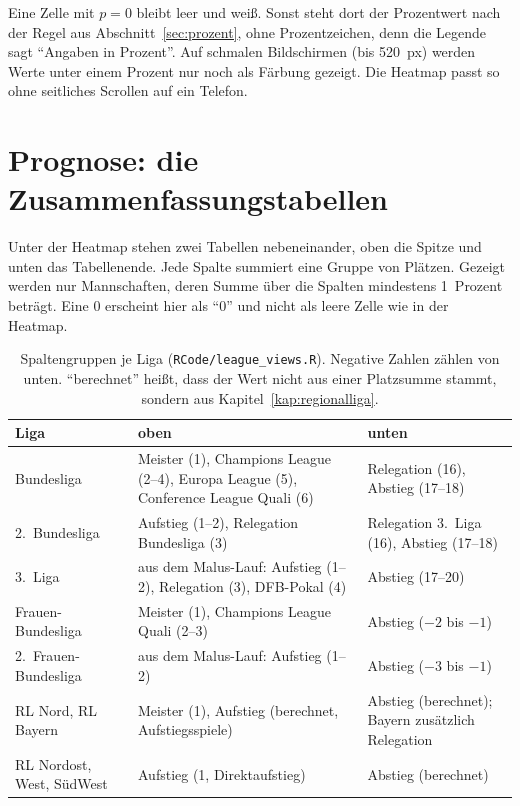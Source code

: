 Eine Zelle mit $p = 0$ bleibt leer und weiß. Sonst steht dort der
Prozentwert nach der Regel aus Abschnitt~\ref{sec:prozent}, ohne
Prozentzeichen, denn die Legende sagt \enquote{Angaben in Prozent}. Auf
schmalen Bildschirmen (bis 520~px) werden Werte unter einem Prozent nur noch
als Färbung gezeigt. Die Heatmap passt so ohne seitliches Scrollen auf ein
Telefon.

\section{Prognose: die Zusammenfassungstabellen}

Unter der Heatmap stehen zwei Tabellen nebeneinander, oben die Spitze und
unten das Tabellenende. Jede Spalte summiert eine Gruppe von Plätzen.
Gezeigt werden nur Mannschaften, deren Summe über die Spalten mindestens
1~Prozent beträgt. Eine 0 erscheint hier als \enquote{0} und nicht als
leere Zelle wie in der Heatmap.

\begin{table}[ht]
\centering\small
\caption{Spaltengruppen je Liga (\texttt{RCode/league\_views.R}). Negative
Zahlen zählen von unten. \enquote{berechnet} heißt, dass der Wert nicht aus
einer Platzsumme stammt, sondern aus Kapitel~\ref{kap:regionalliga}.}
\label{tab:panels}
\begin{tabularx}{\textwidth}{@{}l>{\raggedright}X>{\raggedright\arraybackslash}X@{}}
\toprule
Liga & oben & unten \\
\midrule
Bundesliga & Meister (1), Champions League (2--4), Europa League (5), Conference League Quali (6) & Relegation (16), Abstieg (17--18) \\
2.~Bundesliga & Aufstieg (1--2), Relegation Bundesliga (3) & Relegation 3.~Liga (16), Abstieg (17--18) \\
3.~Liga & aus dem Malus-Lauf: Aufstieg (1--2), Relegation (3), DFB-Pokal (4) & Abstieg (17--20) \\
Frauen-Bundesliga & Meister (1), Champions League Quali (2--3) & Abstieg ($-2$ bis $-1$) \\
2.~Frauen-Bundesliga & aus dem Malus-Lauf: Aufstieg (1--2) & Abstieg ($-3$ bis $-1$) \\
RL Nord, RL Bayern & Meister (1), Aufstieg (berechnet, Aufstiegsspiele) & Abstieg (berechnet); Bayern zusätzlich Relegation \\
RL Nordost, West, SüdWest & Aufstieg (1, Direktaufstieg) & Abstieg (berechnet) \\
\bottomrule
\end{tabularx}
\end{table}

